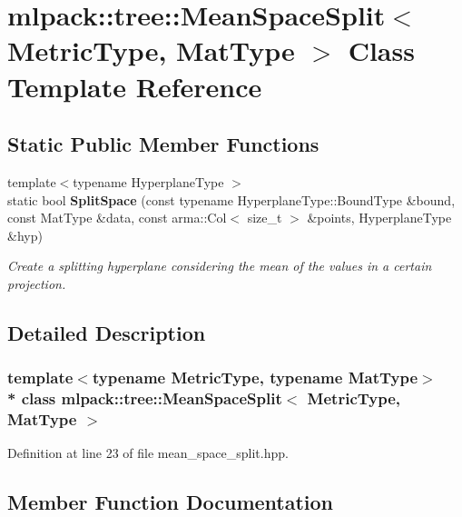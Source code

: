 \section{mlpack\+:\+:tree\+:\+:Mean\+Space\+Split$<$ Metric\+Type, Mat\+Type $>$ Class Template Reference}
\label{classmlpack_1_1tree_1_1MeanSpaceSplit}
\subsection*{Static Public Member Functions}
\begin{DoxyCompactItemize}
\item 
{\footnotesize template$<$typename Hyperplane\+Type $>$ }\\static bool {\bf Split\+Space} (const typename Hyperplane\+Type\+::\+Bound\+Type \&bound, const Mat\+Type \&data, const arma\+::\+Col$<$ size\+\_\+t $>$ \&points, Hyperplane\+Type \&hyp)
\begin{DoxyCompactList}\small\item\em Create a splitting hyperplane considering the mean of the values in a certain projection. \end{DoxyCompactList}\end{DoxyCompactItemize}


\subsection{Detailed Description}
\subsubsection*{template$<$typename Metric\+Type, typename Mat\+Type$>$\\*
class mlpack\+::tree\+::\+Mean\+Space\+Split$<$ Metric\+Type, Mat\+Type $>$}



Definition at line 23 of file mean\+\_\+space\+\_\+split.\+hpp.



\subsection{Member Function Documentation}
